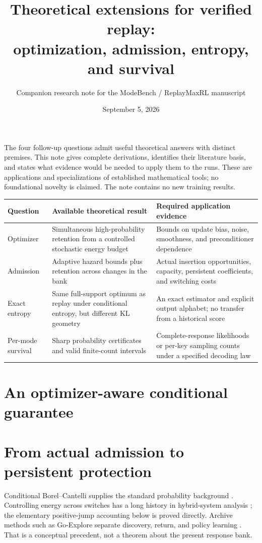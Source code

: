 \documentclass[11pt]{article}
\title{Theoretical extensions for verified replay:\\optimization, admission, entropy, and survival}
\author{Companion research note for the ModeBench / ReplayMaxRL manuscript}
\date{September 5, 2026}
\begin{document}
\maketitle

The four follow-up questions admit useful theoretical answers with distinct
premises. This note gives complete derivations, identifies their literature
basis, and states what evidence would be needed to apply them to the runs.
These are applications and specializations of established mathematical tools;
no foundational novelty is claimed. The note contains no new training results.

\begin{center}
\small
\begin{tabular}{@{}p{}p{}p{}@{}}
\toprule
Question & Available theoretical result & Required application evidence \\
\midrule
Optimizer & Simultaneous high-probability retention from a controlled stochastic energy budget & Bounds on update bias, noise, smoothness, and preconditioner dependence \\
Admission & Adaptive hazard bounds plus retention across changes in the bank & Actual insertion opportunities, capacity, persistent coefficients, and switching costs \\
Exact entropy & Same full-support optimum as replay under conditional entropy, but different KL geometry & An exact estimator and explicit output alphabet; no transfer from a historical score \\
Per-mode survival & Sharp probability certificates and valid finite-count intervals & Complete-response likelihoods or per-key sampling counts under a specified decoding law \\
\bottomrule
\end{tabular}
\end{center}

\section{An optimizer-aware conditional guarantee}
\label{sec:optimizer}


\section{From actual admission to persistent protection}
\label{sec:discovery}
Conditional Borel--Cantelli supplies the standard probability background
\cite[Theorem~4.3.4]{durrett2019}. Controlling energy across switches has a
long history in hybrid-system analysis \cite{branicky1998}; the elementary
positive-jump accounting below is proved directly.
Archive methods such as Go-Explore separate discovery, return, and policy
learning \cite{ecoffet2021}. That is a conceptual precedent, not a theorem
about the present response bank.

\end{document}

